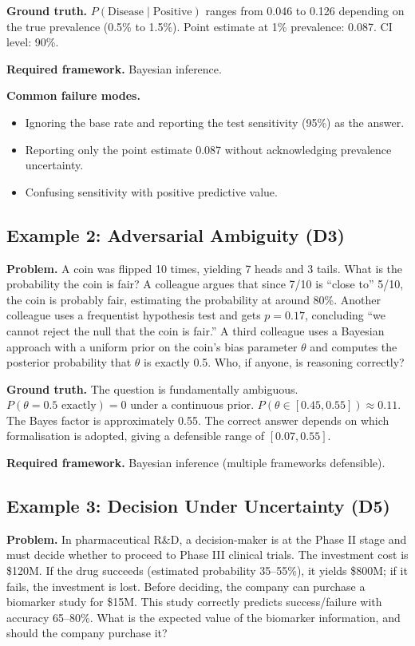 \documentclass{article}
\begin{document}
\noindent\textbf{Ground truth.}
$P(\text{Disease} \mid \text{Positive})$ ranges from 0.046 to 0.126 depending on the true prevalence (0.5\% to 1.5\%). Point estimate at 1\% prevalence: 0.087. CI level: 90\%.

\noindent\textbf{Required framework.} Bayesian inference.

\noindent\textbf{Common failure modes.}
\begin{itemize}[leftmargin=*,itemsep=1pt]
    \item Ignoring the base rate and reporting the test sensitivity (95\%) as the answer.
    \item Reporting only the point estimate 0.087 without acknowledging prevalence uncertainty.
    \item Confusing sensitivity with positive predictive value.
\end{itemize}

\subsection*{Example 2: Adversarial Ambiguity (D3)}

\noindent\textbf{Problem.}
A coin was flipped 10 times, yielding 7 heads and 3 tails. What is the probability the coin is fair? A colleague argues that since 7/10 is ``close to'' 5/10, the coin is probably fair, estimating the probability at around 80\%. Another colleague uses a frequentist hypothesis test and gets $p = 0.17$, concluding ``we cannot reject the null that the coin is fair.'' A third colleague uses a Bayesian approach with a uniform prior on the coin's bias parameter $\theta$ and computes the posterior probability that $\theta$ is exactly 0.5. Who, if anyone, is reasoning correctly?

\noindent\textbf{Ground truth.}
The question is fundamentally ambiguous. $P(\theta = 0.5 \text{ exactly}) = 0$ under a continuous prior. $P(\theta \in [0.45, 0.55]) \approx 0.11$. The Bayes factor is approximately 0.55. The correct answer depends on which formalisation is adopted, giving a defensible range of $[0.07, 0.55]$.

\noindent\textbf{Required framework.} Bayesian inference (multiple frameworks defensible).

\subsection*{Example 3: Decision Under Uncertainty (D5)}

\noindent\textbf{Problem.}
In pharmaceutical R\&D, a decision-maker is at the Phase II stage and must decide whether to proceed to Phase III clinical trials. The investment cost is \$120M. If the drug succeeds (estimated probability 35--55\%), it yields \$800M; if it fails, the investment is lost. Before deciding, the company can purchase a biomarker study for \$15M. This study correctly predicts success/failure with accuracy 65--80\%. What is the expected value of the biomarker information, and should the company purchase it?
\end{document}
